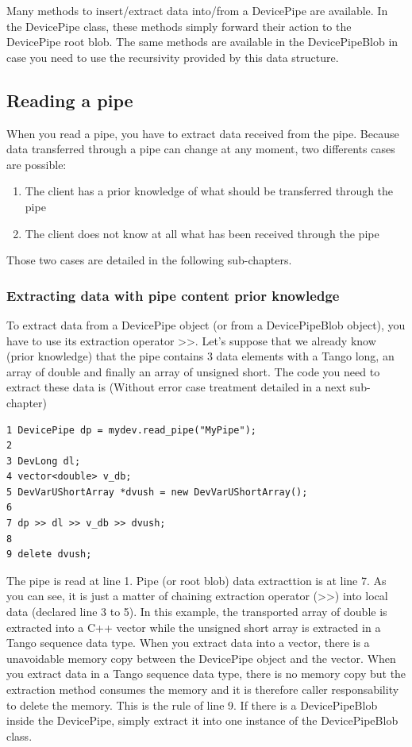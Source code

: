 Many methods to insert/extract data into/from a DevicePipe are available.
In the DevicePipe class, these methods simply forward their action
to the DevicePipe root blob. The same methods are available in the
DevicePipeBlob in case you need to use the recursivity provided by
this data structure.


\subsection{Reading a pipe}

When you read a pipe, you have to extract data received from the pipe.
Because data transferred through a pipe can change at any moment,
two differents cases are possible:
\begin{enumerate}
\item The client has a prior knowledge of what should be transferred through
the pipe
\item The client does not know at all what has been received through the
pipe
\end{enumerate}
Those two cases are detailed in the following sub-chapters.


\subsubsection{Extracting data with pipe content prior knowledge}

To extract data from a DevicePipe object (or from a DevicePipeBlob
object), you have to use its extraction operator \textquotedbl{}>\textcompwordmark{}>\textquotedbl{}.
Let's suppose that we already know (prior knowledge) that the pipe
contains 3 data elements with a Tango long, an array of double and
finally an array of unsigned short. The code you need to extract these
data is (Without error case treatment detailed in a next sub-chapter)


\begin{verbatim}
1 DevicePipe dp = mydev.read_pipe("MyPipe");
2 
3 DevLong dl;  
4 vector<double> v_db;  
5 DevVarUShortArray *dvush = new DevVarUShortArray();
6 
7 dp >> dl >> v_db >> dvush;
8
9 delete dvush;
\end{verbatim}


The pipe is read at line 1. Pipe (or root blob) data extracttion is
at line 7. As you can see, it is just a matter of chaining extraction
operator (\textquotedbl{}>\textcompwordmark{}>\textquotedbl{}) into
local data (declared line 3 to 5). In this example, the transported
array of double is extracted into a C++ vector while the unsigned
short array is extracted in a Tango sequence data type. When you extract
data into a vector, there is a unavoidable memory copy between the
DevicePipe object and the vector. When you extract data in a Tango
sequence data type, there is no memory copy but the extraction method
consumes the memory and it is therefore caller responsability to delete
the memory. This is the rule of line 9. If there is a DevicePipeBlob
inside the DevicePipe, simply extract it into one instance of the
DevicePipeBlob class.


